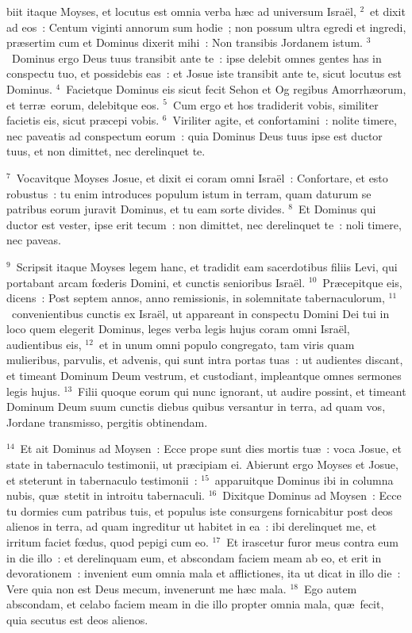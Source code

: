 \bchapter
{}biit itaque Moyses, et locutus est omnia verba h\ae c ad universum Isra\"el,
${}^{2}$~et dixit ad eos~: Centum viginti annorum sum hodie~; non possum ultra egredi et ingredi, pr\ae sertim cum et Dominus dixerit mihi~: Non transibis Jordanem istum.
${}^{3}$~Dominus ergo Deus tuus transibit ante te~: ipse delebit omnes gentes has in conspectu tuo, et possidebis eas~: et Josue iste transibit ante te, sicut locutus est Dominus.
${}^{4}$~Facietque Dominus eis sicut fecit Sehon et Og regibus Amorrh\ae orum, et terr\ae\ eorum, delebitque eos.
${}^{5}$~Cum ergo et hos tradiderit vobis, similiter facietis eis, sicut pr\ae cepi vobis.
${}^{6}$~Viriliter agite, et confortamini~: nolite timere, nec paveatis ad conspectum eorum~: quia Dominus Deus tuus ipse est ductor tuus, et non dimittet, nec derelinquet te.


${}^{7}$~Vocavitque Moyses Josue, et dixit ei coram omni Isra\"el~: Confortare, et esto robustus~: tu enim introduces populum istum in terram, quam daturum se patribus eorum juravit Dominus, et tu eam sorte divides.
${}^{8}$~Et Dominus qui ductor est vester, ipse erit tecum~: non dimittet, nec derelinquet te~: noli timere, nec paveas.


${}^{9}$~Scripsit itaque Moyses legem hanc, et tradidit eam sacerdotibus filiis Levi, qui portabant arcam fœderis Domini, et cunctis senioribus Isra\"el.
${}^{10}$~Pr\ae cepitque eis, dicens~: Post septem annos, anno remissionis, in solemnitate tabernaculorum,
${}^{11}$~convenientibus cunctis ex Isra\"el, ut appareant in conspectu Domini Dei tui in loco quem elegerit Dominus, leges verba legis hujus coram omni Isra\"el, audientibus eis,
${}^{12}$~et in unum omni populo congregato, tam viris quam mulieribus, parvulis, et advenis, qui sunt intra portas tuas~: ut audientes discant, et timeant Dominum Deum vestrum, et custodiant, impleantque omnes sermones legis hujus.
${}^{13}$~Filii quoque eorum qui nunc ignorant, ut audire possint, et timeant Dominum Deum suum cunctis diebus quibus versantur in terra, ad quam vos, Jordane transmisso, pergitis obtinendam.


${}^{14}$~Et ait Dominus ad Moysen~: Ecce prope sunt dies mortis tu\ae~: voca Josue, et state in tabernaculo testimonii, ut pr\ae cipiam ei. Abierunt ergo Moyses et Josue, et steterunt in tabernaculo testimonii~:
${}^{15}$~apparuitque Dominus ibi in columna nubis, qu\ae\ stetit in introitu tabernaculi.
${}^{16}$~Dixitque Dominus ad Moysen~: Ecce tu dormies cum patribus tuis, et populus iste consurgens fornicabitur post deos alienos in terra, ad quam ingreditur ut habitet in ea~: ibi derelinquet me, et irritum faciet fœdus, quod pepigi cum eo.
${}^{17}$~Et irascetur furor meus contra eum in die illo~: et derelinquam eum, et abscondam faciem meam ab eo, et erit in devorationem~: invenient eum omnia mala et afflictiones, ita ut dicat in illo die~: Vere quia non est Deus mecum, invenerunt me h\ae c mala.
${}^{18}$~Ego autem abscondam, et celabo faciem meam in die illo propter omnia mala, qu\ae\ fecit, quia secutus est deos alienos.


